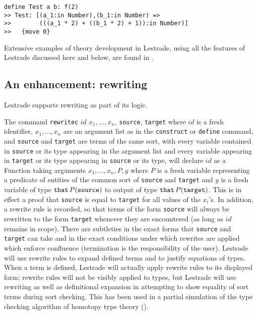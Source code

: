 \documentclass{article}
\begin{document}
\begin{verbatim}
define Test a b: f(2)
>> Test: [(a_1:in Number),(b_1:in Number) => 
>>        (((a_1 * 2) + ((b_1 * 2) + 1)):in Number)]
>>   {move 0}
\end{verbatim}

Extensive examples of theory development in Lestrade, using all the features of Lestrade discussed here and below, are found in \cite{lestrademanual}.

\subsection{An enhancement: rewriting}

Lestrade supports rewriting as part of its logic.

The command {\tt rewritec} $id$ $x_1, \ldots, x_n$, {\tt source}, {\tt target}  where $id$ is a fresh identifier, $x_1, \ldots, x_n$ are an argument list as in the {\tt construct} or {\tt define} command, and {\tt source} and {\tt target} are terms of the same sort, with every variable contained in {\tt source} or its type appearing in the argument list and every variable appearing in {\tt target} or its type appearing in {\tt source} or its type, will declare $id$ as a Function taking arguments $x_1,\ldots,x_n,P,y$ where $P$ is a fresh variable representing a predicate of entities of the common sort of {\tt source} and {\tt target} and $y$ is a fresh variable of type
${\tt that} \,P({\tt source})$ to output of type ${\tt that}\, P({\tt target})$.  This is in effect a proof that {\tt source} is equal to {\tt target} for all values of the $x_i$'s.  In addition, a rewrite rule is recorded, so that terms of the form {\tt source} will always be rewritten to the form {\tt target} whenever they are encountered (as long as $id$ remains in scope).  There are subtleties in the exact forms that {\tt source} and {\tt target} can take and in the exact conditions under which rewrites are applied which enforce confluence (termination is the responsibility of the user).  Lestrade will use rewrite rules to expand defined terms and to justify equations of types.   When a term is defined, Lestrade will actually apply rewrite rules to its displayed form;  rewrite rules will not be visibly applied to types, but Lestrade will use rewriting as well as definitional expansion in attempting to show equality of sort terms during sort checking.   This has been used in a partial simulation of the type checking algorithm of homotopy type theory (\cite{hott}). 
\end{document}
